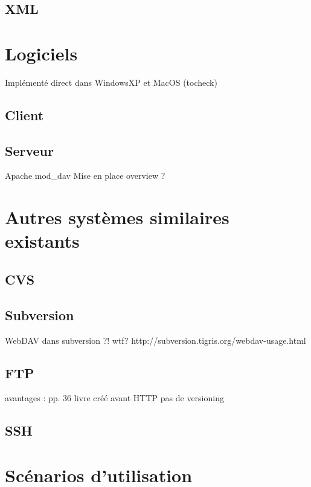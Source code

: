 \documentclass[a4paper, 11pt]{article}
\begin{document}
{	\subsection{XML}

\section{Logiciels}
	Implémenté direct dans WindowsXP et MacOS (tocheck)
	\subsection{Client}
	\subsection{Serveur}
		Apache mod\_dav
		Mise en place overview ?
		
\section{Autres systèmes similaires existants}
	\subsection{CVS}
	\subsection{Subversion}
		WebDAV dans subversion ?! wtf?
		http://subversion.tigris.org/webdav-usage.html
	\subsection{FTP}
		avantages : pp. 36 livre
		créé avant HTTP
		pas de versioning
	\subsection{SSH}
\section{Scénarios d'utilisation}

}
\end{document}
